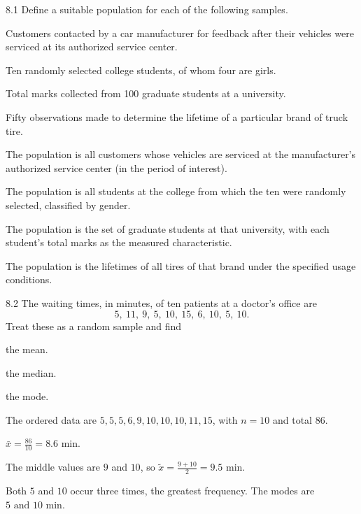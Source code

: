 \documentclass[11pt,oneside]{article}
\begin{document}
\begin{exercise}{8.1}
Define a suitable population for each of the following samples.
\begin{exercisesubparts}
\item Customers contacted by a car manufacturer for feedback after their vehicles were serviced at its authorized service center.
\item Ten randomly selected college students, of whom four are girls.
\item Total marks collected from 100 graduate students at a university.
\item Fifty observations made to determine the lifetime of a particular brand of truck tire.
\end{exercisesubparts}
\end{exercise}
\begin{solution}
\begin{exercisesubparts}
\item The population is all customers whose vehicles are serviced at the manufacturer's authorized service center (in the period of interest).
\item The population is all students at the college from which the ten were randomly selected, classified by gender.
\item The population is the set of graduate students at that university, with each student's total marks as the measured characteristic.
\item The population is the lifetimes of all tires of that brand under the specified usage conditions.
\end{exercisesubparts}
\end{solution}

\begin{exercise}{8.2}
The waiting times, in minutes, of ten patients at a doctor's office are
\[
5, \ 11, \ 9, \ 5, \ 10, \ 15, \ 6, \ 10, \ 5, \ 10.
\]
Treat these as a random sample and find
\begin{exercisesubparts}
\item the mean.
\item the median.
\item the mode.
\end{exercisesubparts}
\end{exercise}
\begin{solution}
The ordered data are $5, 5, 5, 6, 9, 10, 10, 10, 11, 15$, with $n=10$ and total $86$.
\begin{exercisesubparts}
\item $\displaystyle\bar x=\frac{86}{10}=\boxed{8.6\text{ min}}$.
\item The middle values are $9$ and $10$, so $\displaystyle\tilde x=\frac{9+10}{2}=\boxed{9.5\text{ min}}$.
\item Both $5$ and $10$ occur three times, the greatest frequency. The modes are $\boxed{5\text{ and }10\text{ min}}$.
\end{exercisesubparts}
\end{solution}
\end{document}

